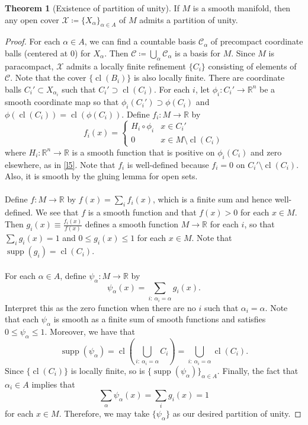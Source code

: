 \documentclass[10pt,letterpaper,cm]{nupset}
\theoremstyle{definition}
\theoremstyle{theorem}
\newtheorem{theorem}[definition]{Theorem}
\theoremstyle{remark}
\newcommand{\R}{\mathbb R}
\newcommand{\1}{\mathbf{1}}
\newcommand{\0}{\vec 0}
\DeclareMathOperator{\supp}{supp}
\DeclareMathOperator{\cl}{cl}
\begin{document}
\begin{theorem}[Existence of partition of unity]
If $M$ is a smooth manifold, then any open cover $\mathcal{X}\coloneqq \{X_{\alpha}\}_{\alpha \in A}$ of $M$ admits a partition of unity. 
\end{theorem}
\begin{proof}
For each $\alpha \in A$, we can find a countable basis $\mathcal{C}_{\alpha}$ of precompact  coordinate balls (centered at $0$) for $X_{\alpha}$. Then $\mathcal{C}\coloneqq \bigcup_{\alpha} \mathcal{C}_{\alpha}$ is a basis for $M$. Since $M$ is paracompact, $\mathcal{X}$ admits a locally finite refinement $\{C_i\}$ consisting of elements of $\mathcal{C}$. Note that the cover $\{\cl(B_i)\}$ is also locally finite. There are coordinate balls $C_i' \subset X_{\alpha_i}$ such that $ C_i'\supset \cl(C_i)$. For each $i$, let $\phi_i : C_i' \to \R^n$ be a smooth coordinate map so that $\phi_i(C_i') \supset \phi(C_i)$ and $\phi(\cl(C_i)) = \cl(\phi(C_i))$. Define $f_i: M \to \R$ by $$f_i(x) = \begin{cases}  H_i \circ \phi_i &   x\in C_i' \\ 0 & x \in M \setminus \cl(C_i)    \end{cases}      $$ where $H_i: \R^n \to \R$ is a smooth function that is positive on $\phi_i(C_i)$ and zero elsewhere, as in \cref{l5}. Note that $f_i$ is well-defined because $f_i=0$ on $C_i' \setminus \cl(C_i)$. Also, it is smooth by the gluing lemma for open sets. 
\\ \\
Define $f: M \to \R$ by $f(x) = \sum_{i}f_i(x)$, which is a finite sum and hence well-defined. We see that $f$ is a smooth function and that $f(x) >0$ for each $x\in M$. Then $g_i(x) \equiv \frac{f_i(x)}{f(x)}$ defines a smooth function $M \to \R$ for each $i$, so that $\sum_i g_i(x) = 1$ and $0\leq g_i(x) \leq 1$ for each $x\in M$. Note that $\supp(g_i) = \cl(C_i)$. 
\\ \\
For each $\alpha \in A$, define $\psi_{\alpha} : M \to \R$ by $$\psi_{\alpha}(x) = \sum_{i:\ \alpha_i=\alpha}g_i(x)     .$$ Interpret this as the zero function when there are no $i$ such that $\alpha_i = \alpha$.  Note that each $\psi_{\alpha}$ is smooth as a finite sum of smooth functions and satisfies $0\leq  \psi_{\alpha} \leq 1$. Moreover, we have that $$\supp(\psi_{\alpha}) = \cl \left(\bigcup_{i:\ \alpha_i=\alpha} C_i \right)= \bigcup_{i:\ \alpha_i=\alpha} \cl(C_i). $$ Since $\{\cl(C_i)\}$ is locally finite, so is $\{\supp(\psi_{\alpha})\}_{\alpha \in A}$. Finally, the fact that $\alpha_i \in A$ implies that $$\sum_{\alpha} \psi_{\alpha}(x) = \sum_i g_i(x) =1$$ for each $x\in M$. Therefore, we may take $\{\psi_{\alpha}\}$ as our desired partition of unity. 
\end{proof}
\end{document}
